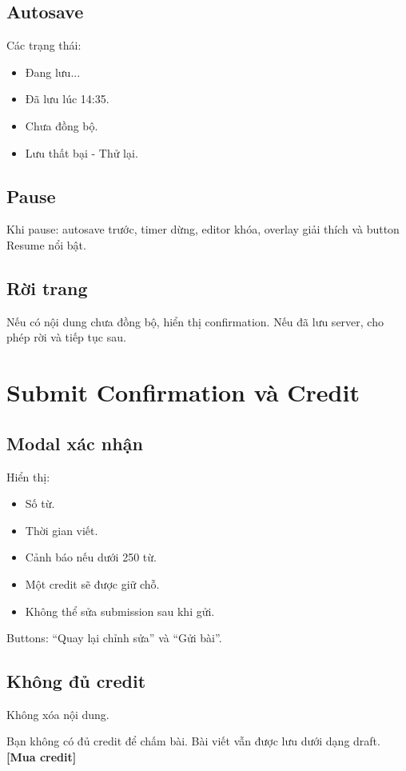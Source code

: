 \documentclass[11pt,a4paper]{article}
\begin{document}
\subsection{Autosave}
Các trạng thái:
\begin{itemize}
  \item Đang lưu...
  \item Đã lưu lúc 14:35.
  \item Chưa đồng bộ.
  \item Lưu thất bại - Thử lại.
\end{itemize}

\subsection{Pause}
Khi pause: autosave trước, timer dừng, editor khóa, overlay giải thích và button Resume nổi bật.

\subsection{Rời trang}
Nếu có nội dung chưa đồng bộ, hiển thị confirmation. Nếu đã lưu server, cho phép rời và tiếp tục sau.

\section{Submit Confirmation và Credit}

\subsection{Modal xác nhận}
Hiển thị:
\begin{itemize}
  \item Số từ.
  \item Thời gian viết.
  \item Cảnh báo nếu dưới 250 từ.
  \item Một credit sẽ được giữ chỗ.
  \item Không thể sửa submission sau khi gửi.
\end{itemize}

Buttons: ``Quay lại chỉnh sửa'' và ``Gửi bài''.

\subsection{Không đủ credit}
Không xóa nội dung.
\begin{copybox}
Bạn không có đủ credit để chấm bài. Bài viết vẫn được lưu dưới dạng draft.\\
\textbf{[Mua credit]} 
\end{copybox}
\end{document}
